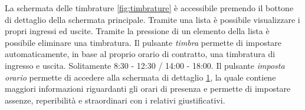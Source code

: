 \documentclass[12pt]{report}
\begin{document}
\begin{multicols}{2}
\begin{figure}[H]
	\caption{}
	\label{fig:timbraturedettaglio}
\end{figure}
\end{multicols}

La schermata delle timbrature \ref{fig:timbrature} è accessibile premendo il bottone di dettaglio della schermata principale. Tramite una lista è possibile visualizzare i propri ingressi ed uscite. Tramite la pressione di un elemento della lista è possibile eliminare una timbratura. Il pulsante \textit{timbra} permette di impostare automaticamente, in base al proprio orario di contratto, una timbratura di ingresso e uscita. Solitamente 8:30 - 12:30 / 14:00 - 18:00. Il pulsante \textit{imposta orario} permette di accedere alla schermata di dettaglio \ref{fig:timbraturedettaglio}, la quale contiene maggiori informazioni riguardanti gli orari di presenza e permette di impostare assenze, reperibilità e straordinari con i relativi giustificativi.
\newpage
\end{document}
